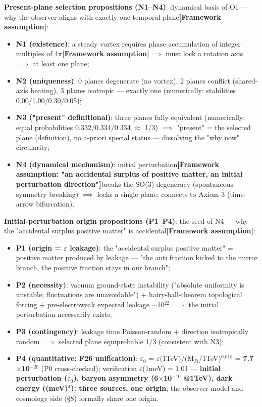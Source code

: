 \documentclass[12pt]{article}
\newcommand{\mtag}[1]{\textbf{[#1]}}
\newcommand{\up}[1]{\ensuremath{^{#1}}}
\newcommand{\down}[1]{\ensuremath{_{#1}}}
\begin{document}
\textbf{Present-plane selection propositions (N1--N4)}: dynamical basis of O1 --- why the observer aligns with exactly one temporal plane\mtag{Framework assumption}:
\begin{itemize}
\item \textbf{N1 (existence)}: a steady vortex requires phase accumulation of integer multiples of 4\ensuremath{\pi}\mtag{Framework assumption}\ensuremath{\implies} must lock a rotation axis \ensuremath{\implies} at least one plane;
\item \textbf{N2 (uniqueness)}: 0 planes degenerate (no vortex), 2 planes conflict (shared-axis beating), 3 planes isotropic --- exactly one (numerically: stabilities 0.00/1.00/0.30/0.05);
\item \textbf{N3 ("present" definitional)}: three planes fully equivalent (numerically: equal probabilities 0.332/0.334/0.334 \ensuremath{\approx} 1/3) \ensuremath{\implies} "present" = the selected plane (definition), no a-priori special status --- dissolving the "why now" circularity;
\item \textbf{N4 (dynamical mechanism)}: initial perturbation\mtag{Framework assumption: "an accidental surplus of positive matter, an initial perturbation direction"}breaks the SO(3) degeneracy (spontaneous symmetry breaking) \ensuremath{\implies} locks a single plane; connects to Axiom 3 (time-arrow bifurcation).
\end{itemize}

\textbf{Initial-perturbation origin propositions (P1--P4)}: the seed of N4 --- why the "accidental surplus positive matter" is accidental\mtag{Framework assumption}:
\begin{itemize}
\item \textbf{P1 (origin = \ensuremath{\varepsilon} leakage)}: the "accidental surplus positive matter" = positive matter produced by leakage --- "the anti fraction kicked to the mirror branch, the positive fraction stays in our branch";
\item \textbf{P2 (necessity)}: vacuum ground-state instability ("absolute uniformity is unstable; fluctuations are unavoidable") + hairy-ball-theorem topological forcing + pre-electroweak expected leakage \ensuremath{\sim}10\up{22} \ensuremath{\implies} the initial perturbation necessarily exists;
\item \textbf{P3 (contingency)}: leakage time Poisson-random + direction isotropically random \ensuremath{\implies} selected plane equiprobable 1/3 (consistent with N3);
\item \textbf{P4 (quantitative: F26 unification)}: \ensuremath{\varepsilon}\down{0} = \ensuremath{\varepsilon}(1TeV)/(M\down{Pl}/1TeV)\up{0.615} = \textbf{7.7\ensuremath{\times}10\up{-20}} (P0 cross-checked); verification \ensuremath{\varepsilon}(1meV) = 1.01 \checkmark --- \textbf{initial perturbation (\ensuremath{\varepsilon}\down{0}), baryon asymmetry (6\ensuremath{\times}10\up{-10} @1TeV), dark energy ((meV)\up{4}): three sources, one origin}; the observer model and cosmology side (\S{}8) formally share one origin.
\end{itemize}
\end{document}
